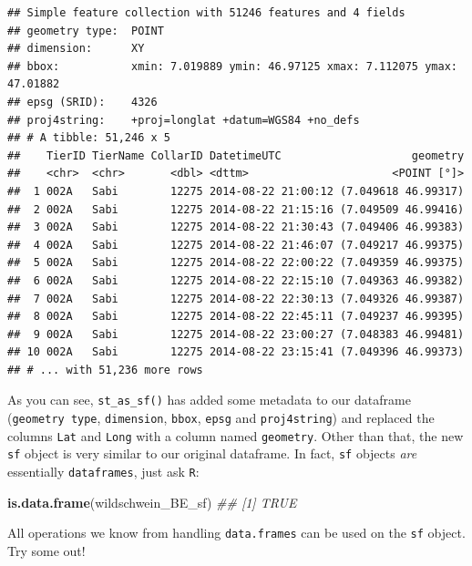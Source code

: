 \documentclass[]{book}
\newenvironment{Shaded}{\begin{snugshade}}{\end{snugshade}}
\newcommand{\CommentTok}[1]{\textcolor[rgb]{0.56,0.35,0.01}{\textit{#1}}}
\newcommand{\DecValTok}[1]{\textcolor[rgb]{0.00,0.00,0.81}{#1}}
\newcommand{\KeywordTok}[1]{\textcolor[rgb]{0.13,0.29,0.53}{\textbf{#1}}}
\newcommand{\NormalTok}[1]{#1}
\newcommand{\OperatorTok}[1]{\textcolor[rgb]{0.81,0.36,0.00}{\textbf{#1}}}
\newcommand{\StringTok}[1]{\textcolor[rgb]{0.31,0.60,0.02}{#1}}
\begin{document}
\begin{verbatim}
## Simple feature collection with 51246 features and 4 fields
## geometry type:  POINT
## dimension:      XY
## bbox:           xmin: 7.019889 ymin: 46.97125 xmax: 7.112075 ymax: 47.01882
## epsg (SRID):    4326
## proj4string:    +proj=longlat +datum=WGS84 +no_defs
## # A tibble: 51,246 x 5
##    TierID TierName CollarID DatetimeUTC                    geometry
##    <chr>  <chr>       <dbl> <dttm>                      <POINT [°]>
##  1 002A   Sabi        12275 2014-08-22 21:00:12 (7.049618 46.99317)
##  2 002A   Sabi        12275 2014-08-22 21:15:16 (7.049509 46.99416)
##  3 002A   Sabi        12275 2014-08-22 21:30:43 (7.049406 46.99383)
##  4 002A   Sabi        12275 2014-08-22 21:46:07 (7.049217 46.99375)
##  5 002A   Sabi        12275 2014-08-22 22:00:22 (7.049359 46.99375)
##  6 002A   Sabi        12275 2014-08-22 22:15:10 (7.049363 46.99382)
##  7 002A   Sabi        12275 2014-08-22 22:30:13 (7.049326 46.99387)
##  8 002A   Sabi        12275 2014-08-22 22:45:11 (7.049237 46.99395)
##  9 002A   Sabi        12275 2014-08-22 23:00:27 (7.048383 46.99481)
## 10 002A   Sabi        12275 2014-08-22 23:15:41 (7.049396 46.99373)
## # ... with 51,236 more rows
\end{verbatim}

As you can see, \texttt{st\_as\_sf()} has added some metadata to our dataframe (\texttt{geometry\ type}, \texttt{dimension}, \texttt{bbox}, \texttt{epsg} and \texttt{proj4string}) and replaced the columns \texttt{Lat} and \texttt{Long} with a column named \texttt{geometry}. Other than that, the new \texttt{sf} object is very similar to our original dataframe. In fact, \texttt{sf} objects \emph{are} essentially \texttt{dataframes}, just ask \texttt{R}:

\begin{Shaded}
\begin{Highlighting}[]
\KeywordTok{is.data.frame}\NormalTok{(wildschwein_BE_sf)}
\CommentTok{## [1] TRUE}
\end{Highlighting}
\end{Shaded}

All operations we know from handling \texttt{data.frames} can be used on the \texttt{sf} object. Try some out!

\begin{Shaded}
\end{Shaded}
\end{document}
